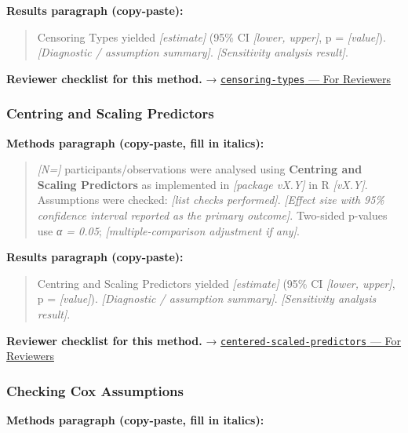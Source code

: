 \documentclass[
]{article}
\begin{document}
\textbf{Results paragraph (copy-paste):}

\begin{quote}
Censoring Types yielded \emph{{[}estimate{]}} (95\% CI \emph{{[}lower,
upper{]}}, p = \emph{{[}value{]}}). \emph{{[}Diagnostic / assumption
summary{]}}. \emph{{[}Sensitivity analysis result{]}}.
\end{quote}

\textbf{Reviewer checklist for this method.} →
\href{../chapters/11-survival/censoring-types.Rmd\#for-reviewers}{\texttt{censoring-types}
--- For Reviewers}

\subsubsection{Centring and Scaling
Predictors}\label{centring-and-scaling-predictors}

\textbf{Methods paragraph (copy-paste, fill in italics):}

\begin{quote}
\emph{{[}N={]}} participants/observations were analysed using
\textbf{Centring and Scaling Predictors} as implemented in
\emph{{[}package vX.Y{]}} in R \emph{{[}vX.Y{]}}. Assumptions were
checked: \emph{{[}list checks performed{]}}. \emph{{[}Effect size with
95\% confidence interval reported as the primary outcome{]}}. Two-sided
p-values use \emph{α = 0.05}; \emph{{[}multiple-comparison adjustment if
any{]}}.
\end{quote}

\textbf{Results paragraph (copy-paste):}

\begin{quote}
Centring and Scaling Predictors yielded \emph{{[}estimate{]}} (95\% CI
\emph{{[}lower, upper{]}}, p = \emph{{[}value{]}}). \emph{{[}Diagnostic
/ assumption summary{]}}. \emph{{[}Sensitivity analysis result{]}}.
\end{quote}

\textbf{Reviewer checklist for this method.} →
\href{../chapters/07-regression/centered-scaled-predictors.Rmd\#for-reviewers}{\texttt{centered-scaled-predictors}
--- For Reviewers}

\subsubsection{Checking Cox Assumptions}\label{checking-cox-assumptions}

\textbf{Methods paragraph (copy-paste, fill in italics):}
\end{document}

